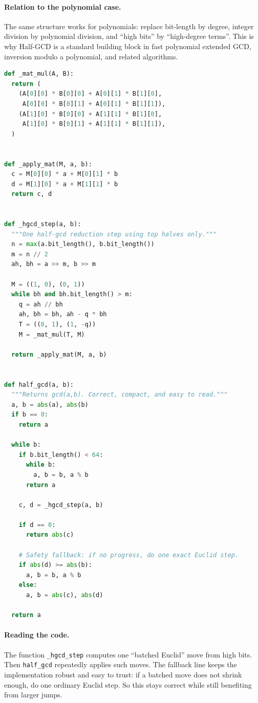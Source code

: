 \paragraph{Relation to the polynomial case.}
The same structure works for polynomials:
replace bit-length by degree, integer division by polynomial division,
and ``high bits'' by ``high-degree terms''.
This is why Half-GCD is a standard building block in fast polynomial
extended GCD, inversion modulo a polynomial, and related algorithms.

\begin{lstlisting}[language=Python,
  caption={Pedagogical Half-GCD (integer version, matrix-batched Euclid)}
]
def _mat_mul(A, B):
  return (
    (A[0][0] * B[0][0] + A[0][1] * B[1][0],
     A[0][0] * B[0][1] + A[0][1] * B[1][1]),
    (A[1][0] * B[0][0] + A[1][1] * B[1][0],
     A[1][0] * B[0][1] + A[1][1] * B[1][1]),
  )


def _apply_mat(M, a, b):
  c = M[0][0] * a + M[0][1] * b
  d = M[1][0] * a + M[1][1] * b
  return c, d


def _hgcd_step(a, b):
  """One half-gcd reduction step using top halves only."""
  n = max(a.bit_length(), b.bit_length())
  m = n // 2
  ah, bh = a >> m, b >> m

  M = ((1, 0), (0, 1))
  while bh and bh.bit_length() > m:
    q = ah // bh
    ah, bh = bh, ah - q * bh
    T = ((0, 1), (1, -q))
    M = _mat_mul(T, M)

  return _apply_mat(M, a, b)


def half_gcd(a, b):
  """Returns gcd(a,b). Correct, compact, and easy to read."""
  a, b = abs(a), abs(b)
  if b == 0:
    return a

  while b:
    if b.bit_length() < 64:
      while b:
        a, b = b, a % b
      return a

    c, d = _hgcd_step(a, b)

    if d == 0:
      return abs(c)

    # Safety fallback: if no progress, do one exact Euclid step.
    if abs(d) >= abs(b):
      a, b = b, a % b
    else:
      a, b = abs(c), abs(d)

  return a
\end{lstlisting}

\paragraph{Reading the code.}
The function \texttt{\_hgcd\_step} computes one ``batched Euclid'' move from high bits.
Then \texttt{half\_gcd} repeatedly applies such moves.
The fallback line keeps the implementation robust and easy to trust:
if a batched move does not shrink enough, do one ordinary Euclid step.
So this stays correct while still benefiting from larger jumps.

